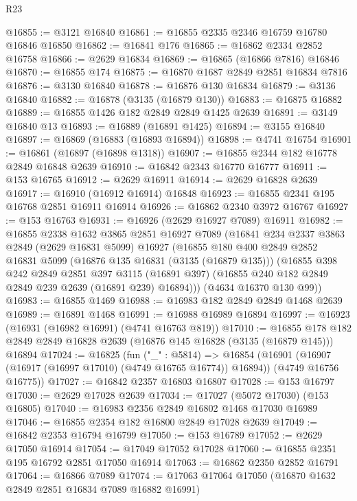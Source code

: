 \begin{lexlean}{R23}
\begin{coremodule}
@16855 := @3121 @16840
@16861 := @16855 @2335 @2346 @16759 @16780 @16846 @16850
@16862 := @16841 @176
@16865 := @16862 @2334 @2852 @16758
@16866 := @2629 @16834
@16869 := @16865 (@16866 @7816) @16846
@16870 := @16855 @174
@16875 := @16870 @1687 @2849 @2851 @16834 @7816
@16876 := @3130 @16840
@16878 := @16876 @130 @16834
@16879 := @3136 @16840
@16882 := @16878 (@3135 (@16879 @130))
@16883 := @16875 @16882
@16889 := @16855 @1426 @182 @2849 @2849 @1425 @2639
@16891 := @3149 @16840 @13
@16893 := @16889 (@16891 @1425)
@16894 := @3155 @16840
@16897 := @16869 (@16883 (@16893 @16894))
@16898 := @4741 @16754
@16901 := @16861 (@16897 (@16898 @1318))
@16907 := @16855 @2344 @182 @16778 @2849 @16848 @2639
@16910 := @16842 @2343 @16770 @16777
@16911 := @153 @16765
@16912 := @2629 @16911
@16914 := @2629 @16828 @2639
@16917 := @16910 (@16912 @16914) @16848
@16923 := @16855 @2341 @195 @16768 @2851 @16911 @16914
@16926 := @16862 @2340 @3972 @16767
@16927 := @153 @16763
@16931 := @16926 (@2629 @16927 @7089) @16911
@16982 := @16855
    @2338
    @1632
    @3865
    @2851
    @16927
    @7089
    (@16841
      @234
      @2337
      @3863
      @2849
      (@2629 @16831 @5099)
      @16927
      (@16855
        @180
        @400
        @2849
        @2852
        @16831
        @5099
        (@16876 @135 @16831 (@3135 (@16879 @135)))
        (@16855
          @398
          @242
          @2849
          @2851
          @397
          @3115
          (@16891 @397)
          (@16855 @240 @182 @2849 @2849 @239 @2639 (@16891 @239) @16894)))
      (@4634 @16370 @130 @99))
@16983 := @16855 @1469
@16988 := @16983 @182 @2849 @2849 @1468 @2639
@16989 := @16891 @1468
@16991 := @16988 @16989 @16894
@16997 := @16923 (@16931 (@16982 @16991) (@4741 @16763 @819))
@17010 := @16855
    @178
    @182
    @2849
    @2849
    @16828
    @2639
    (@16876 @145 @16828 (@3135 (@16879 @145)))
    @16894
@17024 := @16825
    (fun ("_" : @5814) =>
    @16854
      (@16901 (@16907 (@16917 (@16997 @17010) (@4749 @16765 @16774)) @16894))
      (@4749 @16756 @16775))
@17027 := @16842 @2357 @16803 @16807
@17028 := @153 @16797
@17030 := @2629 @17028 @2639
@17034 := @17027 (@5072 @17030) (@153 @16805)
@17040 := @16983 @2356 @2849 @16802 @1468 @17030 @16989
@17046 := @16855 @2354 @182 @16800 @2849 @17028 @2639
@17049 := @16842 @2353 @16794 @16799
@17050 := @153 @16789
@17052 := @2629 @17050 @16914
@17054 := @17049 @17052 @17028
@17060 := @16855 @2351 @195 @16792 @2851 @17050 @16914
@17063 := @16862 @2350 @2852 @16791
@17064 := @16866 @7089
@17074 := @17063 @17064 @17050 (@16870 @1632 @2849 @2851 @16834 @7089 @16882 @16991)

\end{coremodule}
\end{lexlean}
